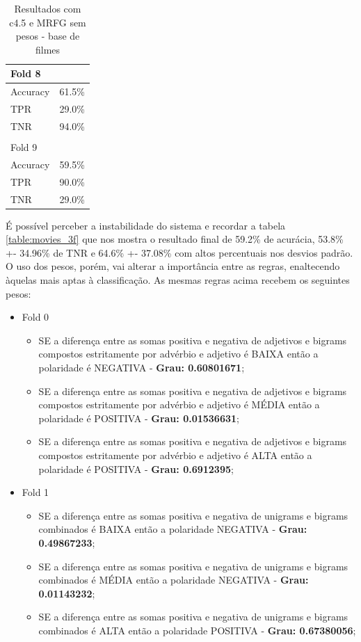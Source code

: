 \documentclass[template.tex]{subfiles}
\begin{document}
\begin{table}[H]
\begin{tabular}{ll}
	Fold 8 \\ \hline
    Accuracy &  61.5\% \\
	TPR &  29.0\% \\
	TNR &  94.0\% \\ \\
	
	Fold 9 \\ \hline
    Accuracy &  59.5\% \\
	TPR &  90.0\% \\
	TNR &  29.0\% \\
    \end{tabular}
    \caption{Resultados com c4.5 e MRFG sem pesos - base de filmes}
    \label{table:movie_folds_2}
\end{table}

É possível perceber a instabilidade do sistema e recordar a tabela \ref{table:movies_3f} que nos mostra o resultado final de 59.2\% de acurácia, 53.8\% +- 34.96\% de TNR e 64.6\% +- 37.08\% com altos percentuais nos desvios padrão. O uso dos pesos, porém, vai alterar a importância entre as regras, enaltecendo àquelas mais aptas à classificação. As mesmas regras acima recebem os seguintes pesos:

\begin{itemize}
\item Fold 0
\begin{itemize}
\item SE a diferença entre as somas positiva e negativa de adjetivos e bigrams compostos estritamente por advérbio e adjetivo é BAIXA então a polaridade é NEGATIVA - \textbf{Grau: 0.60801671};
\item SE a diferença entre as somas positiva e negativa de adjetivos e bigrams compostos estritamente por advérbio e adjetivo é MÉDIA então a polaridade é POSITIVA - \textbf{Grau: 0.01536631};
\item SE a diferença entre as somas positiva e negativa de adjetivos e bigrams compostos estritamente por advérbio e adjetivo é ALTA então a polaridade é POSITIVA  - \textbf{Grau: 0.6912395};
\end{itemize}
\item Fold 1
\begin{itemize}
\item SE a diferença entre as somas positiva e negativa de unigrams e bigrams combinados é BAIXA então a polaridade NEGATIVA  - \textbf{Grau: 0.49867233};
\item SE a diferença entre as somas positiva e negativa de unigrams e bigrams combinados é MÉDIA então a polaridade NEGATIVA  - \textbf{Grau: 0.01143232};
\item SE a diferença entre as somas positiva e negativa de unigrams e bigrams combinados é ALTA então a polaridade POSITIVA  - \textbf{Grau: 0.67380056};
\end{itemize}
\end{itemize}
\end{document}
